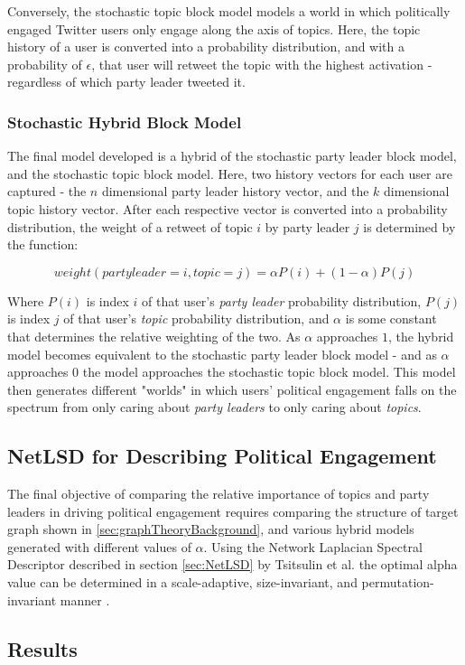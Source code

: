 Conversely, the stochastic topic block model models a world in which politically
engaged Twitter users only engage along the axis of topics. Here, the topic
history of a user is converted into a probability distribution, and with a
probability of $\epsilon$, that user will retweet the topic with the highest
activation - regardless of which party leader tweeted it. 

\subsubsection{Stochastic Hybrid Block Model}\label{sec:SHBM}

The final model developed is a hybrid of the stochastic party leader block
model, and the stochastic topic block model. Here, two history vectors for each
user are captured - the $n$ dimensional party leader history vector, and the
$k$ dimensional topic history vector. After each respective vector is converted
into a probability distribution, the weight of a retweet of
topic $i$ by party leader $j$ is determined by the function:

\begin{equation}
    weight(party leader=i, topic=j)=\alpha P(i)+(1-\alpha)P(j)
\end{equation}

Where $P(i)$ is index $i$ of that user's \emph{party leader} probability
distribution, $P(j)$ is index $j$ of that user's \emph{topic} probability
distribution, and $\alpha$ is some constant that determines the relative
weighting of the two. As $\alpha$ approaches $1$, the hybrid model becomes
equivalent to the stochastic party leader block model - and as $\alpha$
approaches $0$ the model approaches the stochastic topic block model. This model
then generates different "worlds" in which users' political engagement falls on
the spectrum from only caring about \emph{party leaders} to only caring about
\emph{topics}.

\subsection{NetLSD for Describing Political Engagement}\label{sec:NetLSDForSBM}

The final objective of comparing the relative importance of topics and party
leaders in driving political engagement requires comparing the structure of
target graph shown in \ref{sec:graphTheoryBackground}, and various hybrid models
generated with different values of $\alpha$. Using the Network Laplacian
Spectral Descriptor described in section \ref{sec:NetLSD} by Tsitsulin et al.
the optimal alpha value can be determined in a scale-adaptive, size-invariant,
and permutation-invariant manner \cite{netlsd}.

\subsection{Results}\label{sec:SBMsResults}


